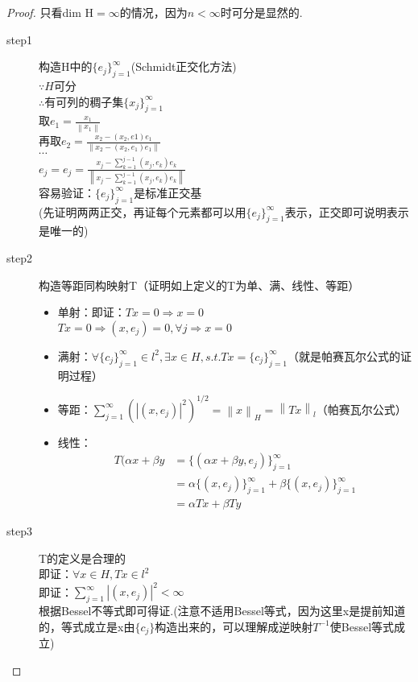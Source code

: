 \documentclass[12pt, a4paper, oneside]{ctexbook}
\begin{document}
\begin{proof}
只看dim H$=\infty$的情况，因为$n<\infty$时可分是显然的.\\
\begin{description}
	\item[step1] 构造H中的$\{e_j\}_{j=1}^{\infty}$(Schmidt正交化方法)\\
	$\because H$可分\\
	$\therefore $有可列的稠子集$\{x_j\}_{j=1}^{\infty}$\\
	取$e_1=\frac{x_1}{\left \| x_1\right \|}$\\
	再取$e_2=\frac{x_2-(x_2,e1)e_1}{\left \| x_2-(x_2,e_1)e_1\right \|}$\\
	$\cdots$\\
	$e_j=e_j=\frac{ x_j-\sum_{k=1}^{j-1}(x_j,e_k)e_k}{\left \| x_j-\sum_{k=1}^{j-1}(x_j,e_k)e_k\right \|}$\\
	容易验证：$\{e_j\}_{j=1}^{\infty}$是标准正交基\\
	(先证明两两正交，再证每个元素都可以用$\{e_j\}_{j=1}^{\infty}$表示，正交即可说明表示是唯一的)
	\item[step2] 构造等距同构映射T（证明如上定义的T为单、满、线性、等距）\\
	\begin{itemize}
		\item $\textbf{单射}$：即证：$Tx=0 \Rightarrow x=0$\\
		$Tx=0\Rightarrow (x,e_j)=0,\forall j\Rightarrow x=0$
		\item $\textbf{满射}$：$\forall \{c_j\}_{j=1}^{\infty}\in l^2,\exists x\in H,s.t. Tx=\{c_j\}_{j=1}^{\infty}$（就是帕赛瓦尔公式的证明过程）
		\item $\textbf{等距}$：$\sum_{j=1}^{\infty}(\left | (x,e_j)\right |^2)^{1/2}=\left \| x\right \|_H=\left \| Tx\right \|_l$（帕赛瓦尔公式）
		\item $\textbf{线性}$：\begin{align*}
			T(\alpha x+\beta y&=\{(\alpha x+\beta y,e_j)\}_{j=1}^{\infty}\\
			&=\alpha\{(x,e_j)\}_{j=1}^{\infty}+\beta\{(x,e_j)\}_{j=1}^{\infty}\\
			&=\alpha Tx+\beta Ty
		\end{align*}
	\end{itemize}
\item[step3] T的定义是合理的\\
即证：$\forall x\in H,Tx\in l^2$\\
即证：$\sum_{j=1}^{\infty}\left | (x,e_j)\right |^2<\infty$\\
根据Bessel不等式即可得证.(注意不适用Bessel等式，因为这里x是提前知道的，等式成立是x由$\{c_j\}$构造出来的，可以理解成逆映射$T^{-1}$使Bessel等式成立)
\end{description}
\end{proof}
\end{document}
